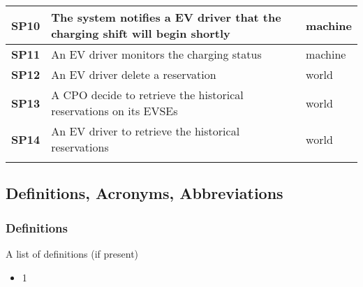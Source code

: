 \begin{table}[h]
\begin{tabular}{|l|l|l|}
        \textbf{SP10} & The system notifies a EV driver that the charging shift will begin shortly                                                                                            & machine \\ \midrule
        \textbf{SP11} & An EV driver monitors the charging status                                                                                                                             & machine \\ \midrule
        \textbf{SP12} & An EV driver delete a reservation                                                                                                                                     & world   \\ \midrule
        \textbf{SP13} & A CPO decide to retrieve the historical reservations on its EVSEs                                                                                                     & world   \\ \midrule
        \textbf{SP14} & An EV driver to retrieve the historical reservations                                                                                                                  & world   \\ \midrule
                      &                                                                                                                                                                                 \\ \bottomrule
    \end{tabular}
\end{table}


\subsection{Definitions, Acronyms, Abbreviations}
\subsubsection*{Definitions}
A list of definitions (if present)
\begin{itemize}
    \item 1
\end{itemize}
